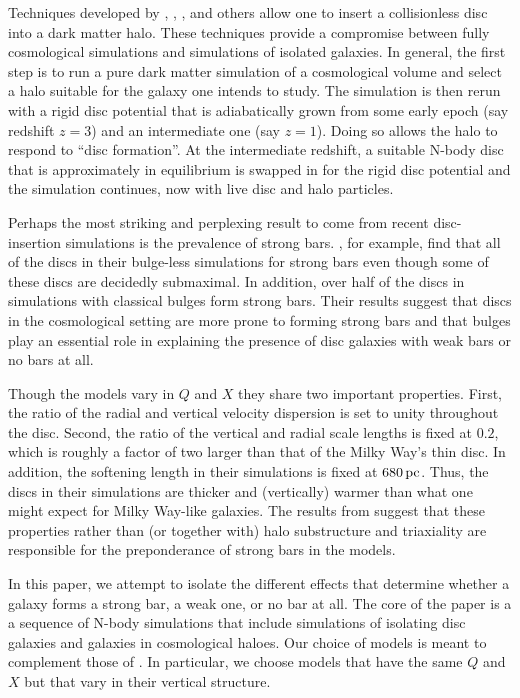 Techniques developed by \citet{BerentzenShlosmanStellarDisks},
\citet{DeBuhrStellarDisks}, \citet{YurinSpringelStellarDisks},
\citet{Bauer2018a} and others allow one to insert a collisionless disc
into a dark matter halo.  These techniques provide a compromise
between fully cosmological simulations and simulations of isolated
galaxies.  In general, the first step is to run a pure dark matter
simulation of a cosmological volume and select a halo suitable for the
galaxy one intends to study.  The simulation is then rerun with a rigid
disc potential that is adiabatically grown from some early epoch (say
redshift $z=3$) and an intermediate one (say $z=1$).  Doing so allows
the halo to respond to ``disc formation''.  At the intermediate
redshift, a suitable N-body disc that is approximately in equilibrium
is swapped in for the rigid disc potential and the simulation
continues, now with live disc and halo particles.

Perhaps the most striking and perplexing result to come from recent
disc-insertion simulations is the prevalence of strong bars.
\citet{YurinSpringelStellarDisks}, for example, find that all of the
discs in their bulge-less simulations for strong bars even though some
of these discs are decidedly submaximal.  In addition, over half of
the discs in simulations with classical bulges form strong bars.
Their results suggest that discs in the cosmological setting are more
prone to forming strong bars and that bulges play an essential role in
explaining the presence of disc galaxies with weak bars or no bars at
all.

Though the \citet{YurinSpringelStellarDisks} models vary in $Q$ and
$X$ they share two important properties.  First, the ratio of the
radial and vertical velocity dispersion is set to unity throughout the
disc.  Second, the ratio of the vertical and radial scale lengths is
fixed at $0.2$, which is roughly a factor of two larger than that of
the Milky Way's thin disc.  In addition, the softening length in their
simulations is fixed at $680\,{\rm pc}$.  Thus, the discs in their
simulations are thicker and (vertically) warmer than what one might
expect for Milky Way-like galaxies.  The results from
\citet{Klypin2009} suggest that these properties rather than (or
together with) halo substructure and triaxiality are responsible for
the preponderance of strong bars in the
\citet{YurinSpringelStellarDisks} models.

In this paper, we attempt to isolate the different effects that
determine whether a galaxy forms a strong bar, a weak one, or no bar
at all.  The core of the paper is a a sequence of N-body simulations
that include simulations of isolating disc galaxies and galaxies in
cosmological haloes.  Our choice of models is meant to complement
those of \citet{YurinSpringelStellarDisks}.  In particular, we choose
models that have the same $Q$ and $X$ but that vary in 
their vertical structure.  

